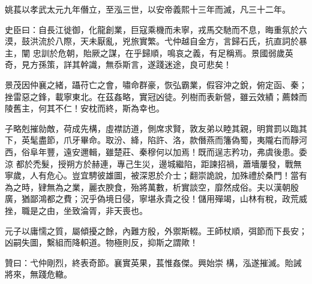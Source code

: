 \begin{pinyinscope}
 姚萇以孝武太元九年僭立，至泓三世，以安帝義熙十三年而滅，凡三十二年。



 史臣曰：自長江徙御，化龍創業，巨寇乘機而未寧，戎馬交馳而不息，晦重氛於六漠，鼓洪流於八際，天未厭亂，兇旅實繁。弋仲越自金方，言歸石氏，抗直詞於暴主，闡
 忠訓於危朝，貽厥之謀，在乎歸順，鳴哀之義，有足稱焉。景國弱歲英奇，見方孫策，詳其幹識，無忝斯言，遂踐迷途，良可悲矣！



 景茂因仲襄之緒，躡苻亡之會，嘯命群豪，恢弘霸業，假容沖之銳，俯定函、秦；挫雷惡之鋒，載寧東北。在茲姦略，實冠凶徒。列樹而表新營，雖云效績；薦棘而陵舊主，何其不仁！安枕而終，斯為幸也。



 子略剋摧勍敵，荷成先構，虛襟訪道，側席求賢，敦友弟以睦其親，明賞罰以臨其下，英髦盡節，爪牙畢命。取汾、絳，陷許、洛，款僭燕而籓偽蜀，夷隴右而靜河西，俗阜年豐，遠安邇輯，雖楚莊、秦穆何以加焉！既而逞志矜功，弗虞後患。委涼
 都於禿髮，授朔方於赫連，專己生災，邊城繼陷，距諫招禍，蕭墻屢發，戰無寧歲，人有危心。豈宜騁彼雄圖，被深恩於介士；翻崇詭說，加殊禮於桑門！當有為之時，肄無為之業，麗衣腴食，殆將萬數，析實談空，靡然成俗。夫以漢朝殷廣，猶鄙鴻都之費；況乎偽境日侵，寧堪永貴之役！儲用殫竭，山林有稅，政荒威挫，職是之由，坐致淪胥，非天喪也。



 元子以庸懦之質，屬傾擾之餘，內難方殷，外禦斯輟。王師杖順，弭節而下長安；凶嗣失圖，繫組而降軹道。物極則反，抑斯之謂歟！



 贊曰：弋仲剛烈，終表奇節。襄實英果，萇惟姦傑。興始崇
 構，泓遂摧滅。貽誡將來，無踐危轍。



\end{pinyinscope}
